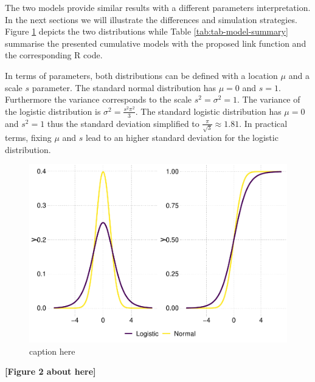 \documentclass[
  man,floatsintext]{apa6}
\begin{document}
The two models provide similar results with a different parameters interpretation. In the next sections we will illustrate the differences and simulation strategies. Figure \ref{fig:fig-logit-vs-probit} depicts the two distributions while Table \ref{tab:tab-model-summary} summarise the presented cumulative models with the proposed link function and the corresponding R code.

In terms of parameters, both distributions can be defined with a location \(\mu\) and a scale \(s\) parameter. The standard normal distribution has \(\mu = 0\) and \(s = 1\). Furthermore the variance corresponds to the scale \(s^2 = \sigma^2 = 1\). The variance of the logistic distribution is \(\sigma^2 = \frac{s^2\pi^2}{3}\). The standard logistic distribution has \(\mu = 0\) and \(s^2 = 1\) thus the standard deviation simplified to \(\frac{\pi}{\sqrt{3}} \approx 1.81\). In practical terms, fixing \(\mu\) and \(s\) lead to an higher standard deviation for the logistic distribution.

\scriptsize

\begin{figure}

{\centering \includegraphics{paper_files/figure-latex/fig-logit-vs-probit-1} 

}

\caption{caption here}\label{fig:fig-logit-vs-probit}
\end{figure}

\begin{center}\textbf{[Figure 2 about here]} \end{center}

\normalsize
\end{document}
